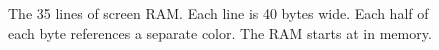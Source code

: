 \begin{figure}[H]
{\begin{adjustbox}{width=11.5cm,center}
  \end{adjustbox}

}\caption*{The 35 lines of screen RAM. Each line is 40 bytes wide. Each half of each byte references a separate color. The RAM starts at 
in memory.}
\end{figure}
